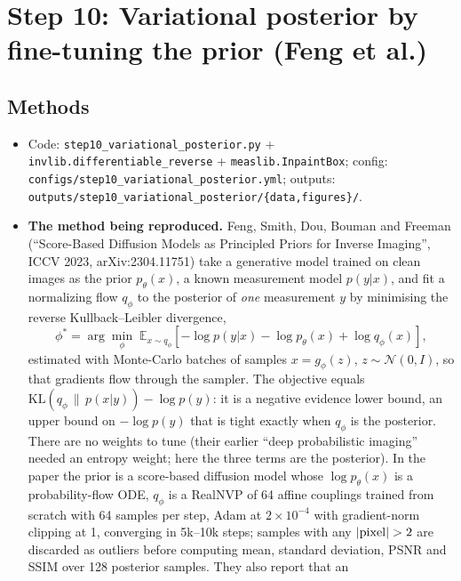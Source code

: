 \documentclass[11pt]{article}
\begin{document}
\section{Step 10: Variational posterior by fine-tuning the prior (Feng et al.)}
\label{sec:step10}

\subsection{Methods}
\begin{itemize}
  \item Code: \texttt{step10\_variational\_posterior.py} +
        \texttt{invlib.differentiable\_reverse} + \texttt{measlib.InpaintBox};
        config: \texttt{configs/step10\_variational\_posterior.yml}; outputs:
        \texttt{outputs/step10\_variational\_posterior/\{data,figures\}/}.
  \item \textbf{The method being reproduced.} Feng, Smith, Dou, Bouman and
        Freeman (``Score-Based Diffusion Models as Principled
        Priors for Inverse Imaging'', ICCV 2023, arXiv:2304.11751) take a generative model
        trained on clean images as the prior $p_\theta(x)$, a known
        measurement model $p(y|x)$, and fit a normalizing flow $q_\phi$ to
        the posterior of \emph{one} measurement $y$ by minimising the reverse
        Kullback--Leibler divergence,
        \[
          \phi^{*} = \arg\min_{\phi}\;
          \mathbb{E}_{x \sim q_\phi}\!\left[ -\log p(y|x) - \log p_\theta(x)
          + \log q_\phi(x) \right],
        \]
        estimated with Monte-Carlo batches of samples $x = g_\phi(z)$,
        $z \sim \mathcal{N}(0, I)$, so that gradients flow through the
        sampler. The objective equals $\mathrm{KL}(q_\phi \,\|\, p(x|y)) -
        \log p(y)$: it is a negative evidence lower bound, an upper bound on
        $-\log p(y)$ that is tight exactly when $q_\phi$ is the posterior.
        There are no weights to tune (their earlier ``deep probabilistic
        imaging'' needed an entropy weight; here the three terms are the
        posterior). In the paper the prior is a score-based diffusion model
        whose $\log p_\theta(x)$ is a probability-flow ODE, $q_\phi$ is a
        RealNVP of 64 affine couplings trained from scratch with 64 samples
        per step, Adam at $2 \times 10^{-4}$ with gradient-norm clipping at
        1, converging in 5k--10k steps; samples with any $|{\rm pixel}| > 2$
        are discarded as outliers before computing mean, standard deviation,
        PSNR and SSIM over 128 posterior samples. They also report that an

\end{itemize}
\end{document}
